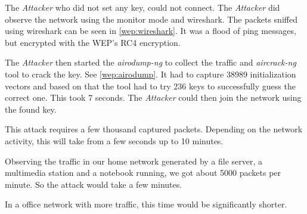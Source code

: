 \documentclass[12pt,a4paper]{article}
\begin{document}
	The \emph{Attacker} who did not set any key, could not connect.
	The \emph{Attacker} did observe the network using the monitor mode and wireshark.
	The packets sniffed using wireshark can be seen in \autoref{wep:wireshark}. It was a flood of ping messages, but encrypted with the WEP's RC4 encryption.
	
	The \emph{Attacker} then started the \emph{airodump-ng} to collect the traffic and \emph{aircrack-ng} tool to crack the key. See \autoref{wep:airodump}.
	It had to capture 38989 initialization vectors and based on that the tool had to try 236 keys to successfully guess the correct one. This took 7 seconds.
	The \emph{Attacker} could then join the network using the found key.
	
	This attack requires a few thousand captured packets. Depending on the network activity, this will take from a few seconds up to 10 minutes.
	
	Observing the traffic in our home network generated by a file server, a multimedia station and a notebook running, we got about 5000 packets per minute. So the attack would take a few minutes.
	
	In a office network with more traffic, this time would be significantly shorter.
	
\end{document}
